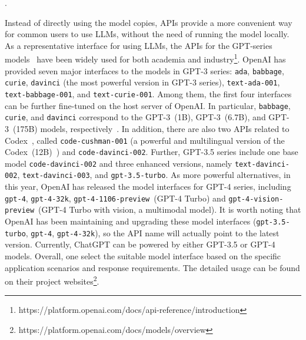 {{.
\label{sec:apis_for_llms}
{Instead of directly using the model copies, APIs provide a more convenient way for common users to use LLMs, without the need of running the model locally. As a representative interface for using LLMs, the APIs for the GPT-series models~\cite{Brown-NeurIPS-2020-Language, Chen-arxiv-2021-evaluating, Ouyang-arxiv-2022-Training, OpenAI-OpenAI-2023-GPT-4} have been widely used for both academia and industry\footnote{{https://platform.openai.com/docs/api-reference/introduction}}. OpenAI has provided  {seven major interfaces to the models in GPT-3 series: \texttt{ada}, \texttt{babbage}, \texttt{curie}, \texttt{davinci} (the most powerful version in GPT-3 series), \texttt{text-ada-001}, \texttt{text-babbage-001}, and \texttt{text-curie-001}.}  Among them, the first four interfaces can be further fine-tuned on the host server of OpenAI.  
In particular, \texttt{babbage}, \texttt{curie}, and \texttt{davinci} correspond to the GPT-3~(1B), GPT-3~(6.7B), and GPT-3~(175B) models, respectively~\cite{Brown-NeurIPS-2020-Language}. 
In addition, there are also two APIs related to Codex~\cite{Chen-arxiv-2021-evaluating}, called \texttt{code-cushman-001} (a powerful and multilingual version of the Codex~(12B)~\cite{Chen-arxiv-2021-evaluating}) and \texttt{code-davinci-002}.
Further, GPT-3.5 series include one base model \texttt{code-davinci-002} and  three enhanced versions, namely \texttt{text-davinci-002}, \texttt{text-davinci-003}, and \texttt{gpt-3.5-turbo}.
As more powerful alternatives, in this year, OpenAI has released the model interfaces for GPT-4 series, including \texttt{gpt-4}, \texttt{gpt-4-32k}, \texttt{gpt-4-1106-preview}~(\ie GPT-4 Turbo) and \texttt{gpt-4-vision-preview}~(\ie GPT-4 Turbo with vision, a multimodal model). 
{It is worth noting that OpenAI has been  maintaining and upgrading these model interfaces (\texttt{gpt-3.5-turbo}, \texttt{gpt-4}, \texttt{gpt-4-32k}), so the API name will actually point to the latest version. } 
Currently, ChatGPT can be  powered by either GPT-3.5 or GPT-4 models.  Overall, one select the suitable model interface based on the specific application scenarios and response requirements.
The detailed usage can be found on their project websites\footnote{https://platform.openai.com/docs/models/overview}.
 

}}}
